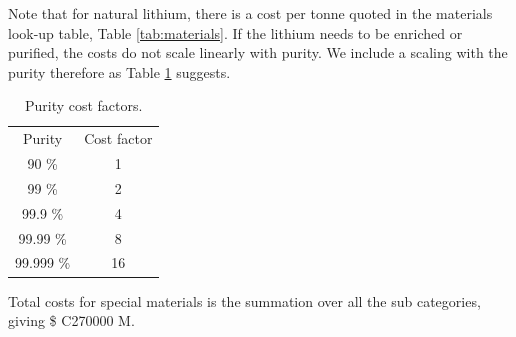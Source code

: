 Note that for natural lithium, there is a cost per tonne quoted in the materials look-up table, Table \ref{tab:materials}.  If the lithium needs to be enriched or purified, the costs do not scale linearly with purity.  We include a scaling with the purity therefore as Table \ref{tab:purity} suggests.

\begin{table}[]
    \centering
    \begin{tabular}{c|c}
       Purity  &  Cost factor \\
       90 \%  &  1 \\
       99 \%  &  2 \\
       99.9 \%  &  4 \\
       99.99 \%  &  8 \\
       99.999 \%  &  16 \\
    \end{tabular}
    \caption{Purity cost factors.}
    \label{tab:purity}
\end{table}

Total costs for special materials is the summation over all the sub categories, giving \$ C270000 M.  



